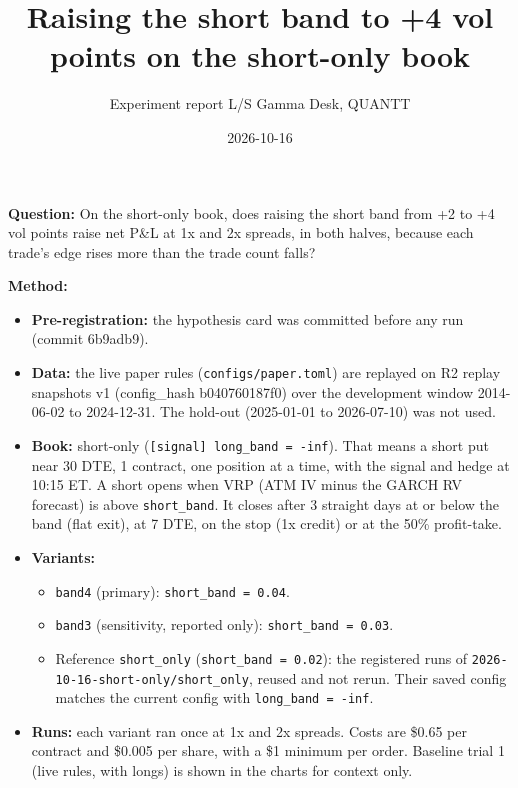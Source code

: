 \documentclass{article}
\title{Raising the short band to +4 vol points on the short-only book}
\author{Experiment report \textperiodcentered{} L/S Gamma Desk, QUANTT}
\date{2026-10-16}
\begin{document}
\maketitle

\textbf{Question:} On the short-only book, does raising the short band from +2 to +4 vol points raise net P\&L at 1x and 2x spreads, in both halves, because each trade's edge rises more than the trade count falls?

\textbf{Method:}

\begin{itemize}

\item \textbf{Pre-registration:} the hypothesis card was committed before any run (commit 6b9adb9).

\item \textbf{Data:} the live paper rules (\texttt{configs/\allowbreak{}paper.\allowbreak{}toml}) are replayed on R2 replay snapshots v1 (config\_hash b040760187f0) over the development window 2014-06-02 to 2024-12-31. The hold-out (2025-01-01 to 2026-07-10) was not used.

\item \textbf{Book:} short-only (\texttt{[signal] long\_\allowbreak{}band = -\allowbreak{}inf}). That means a short put near 30 DTE, 1 contract, one position at a time, with the signal and hedge at 10:15 ET. A short opens when VRP (ATM IV minus the GARCH RV forecast) is above \texttt{short\_\allowbreak{}band}. It closes after 3 straight days at or below the band (flat exit), at 7 DTE, on the stop (1x credit) or at the 50\% profit-take.

\item \textbf{Variants:}

\begin{itemize}

\item \texttt{band4} (primary): \texttt{short\_\allowbreak{}band = 0.\allowbreak{}04}.

\item \texttt{band3} (sensitivity, reported only): \texttt{short\_\allowbreak{}band = 0.\allowbreak{}03}.

\item Reference \texttt{short\_\allowbreak{}only} (\texttt{short\_\allowbreak{}band = 0.\allowbreak{}02}): the registered runs of \texttt{2026-\allowbreak{}10-\allowbreak{}16-\allowbreak{}short-\allowbreak{}only/\allowbreak{}short\_\allowbreak{}only}, reused and not rerun. Their saved config matches the current config with \texttt{long\_\allowbreak{}band = -\allowbreak{}inf}.

\end{itemize}

\item \textbf{Runs:} each variant ran once at 1x and 2x spreads. Costs are \$0.65 per contract and \$0.005 per share, with a \$1 minimum per order. Baseline trial 1 (live rules, with longs) is shown in the charts for context only.

\end{itemize}
\end{document}
